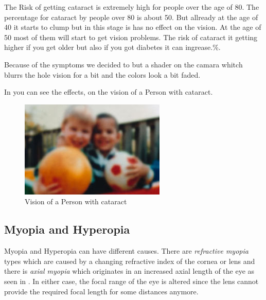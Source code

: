 \documentclass{sig-alternate-05-2015}
\begin{document}
The Risk of getting cataract is extremely high for people over the age of 80. The percentage for cataract by people over 80 is about 50. But allready at the age of 40 it starts to clump but in this stage is has no effect on the vision. At the age of 50 most of them will start to get vision problems. The risk of cataract it getting higher if you get older but also if you got diabetes it can ingrease.\%.~\cite{cataractfacts}

Because of the symptoms we decided to but a shader on the camara whitch blurrs the hole vision for a bit and the colors look a bit faded.

In  you can see the effects, on the vision of a Person with cataract.

\begin{figure}
    \centering
    \includegraphics[width=\columnwidth]{cataractvision.png}
    \caption{Vision of a Person with cataract}
    \label{fig:cataract}
\end{figure}

\subsection{Myopia and Hyperopia}

Myopia and Hyperopia can have different causes. There are \emph{refractive myopia} types which are caused by a changing refractive index of the cornea or lens and there is \emph{axial myopia} which originates in an increased axial length of the eye as seen in .
In either case, the focal range of the eye is altered since the lens cannot provide the required focal length for some distances anymore.
\end{document}
